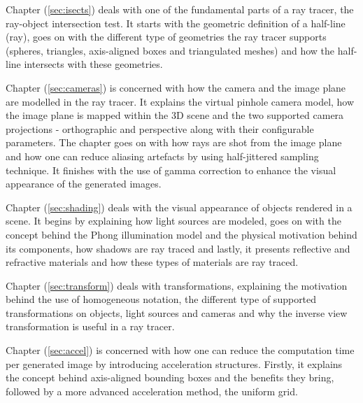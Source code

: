\documentclass{article}
\begin{document}
Chapter (\ref{sec:isects}) deals with one of the fundamental parts of a ray tracer, the ray-object intersection test. It starts with the geometric definition of a half-line (ray), goes on with the different type of geometries the ray tracer supports (spheres, triangles, axis-aligned boxes and triangulated meshes) and how the half-line intersects with these geometries.

\vspace*{\baselineskip}

Chapter (\ref{sec:cameras}) is concerned with how the camera and the image plane are modelled in the ray tracer. It explains the virtual pinhole camera model, how the image plane is mapped within the 3D scene and the two supported camera projections - orthographic and perspective along with their configurable parameters. The chapter goes on with how rays are shot from the image plane and how one can reduce aliasing artefacts by using half-jittered sampling technique. It finishes with the use of gamma correction to enhance the visual appearance of the generated images. 

\vspace*{\baselineskip}

Chapter (\ref{sec:shading}) deals with the visual appearance of objects rendered in a scene. It begins by explaining how light sources are modeled, goes on with the concept behind the Phong illumination model and the physical motivation behind its components, how shadows are ray traced and lastly, it presents reflective and refractive materials and how these types of materials are ray traced.

\vspace*{\baselineskip}

Chapter (\ref{sec:transform}) deals with transformations, explaining the motivation behind the use of homogeneous notation, the different type of supported transformations on objects, light sources and cameras and why the inverse view transformation is useful in a ray tracer.

\vspace*{\baselineskip}

Chapter (\ref{sec:accel}) is concerned with how one can reduce the computation time per generated image by introducing acceleration structures. Firstly, it explains the concept behind axis-aligned bounding boxes and the benefits they bring, followed by a more advanced acceleration method, the uniform grid.

\end{document}
